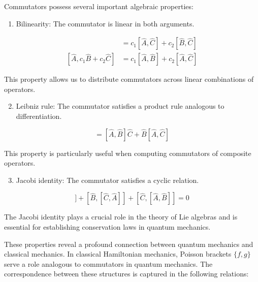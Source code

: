 \documentclass[10pt]{article}
\begin{document}
Commutators possess several important algebraic properties:

\begin{enumerate}
  \item Bilinearity: The commutator is linear in both arguments.
\end{enumerate}

\begin{align*}
[c_{1}\hat{A} + c_{2}\hat{B}, \hat{C}] &= c_{1}[\hat{A}, \hat{C}] + c_{2}[\hat{B}, \hat{C}] \\
[\hat{A}, c_{1}\hat{B} + c_{2}\hat{C}] &= c_{1}[\hat{A}, \hat{B}] + c_{2}[\hat{A}, \hat{C}] \tag{1.53}
\end{align*}

This property allows us to distribute commutators across linear combinations of operators.

\begin{enumerate}
  \setcounter{enumi}{1}
  \item Leibniz rule: The commutator satisfies a product rule analogous to differentiation.
\end{enumerate}

\begin{equation*}
[\hat{A}, \hat{B}\hat{C}] = [\hat{A}, \hat{B}]\hat{C} + \hat{B}[\hat{A}, \hat{C}] \tag{1.54}
\end{equation*}

This property is particularly useful when computing commutators of composite operators.

\begin{enumerate}
  \setcounter{enumi}{2}
  \item Jacobi identity: The commutator satisfies a cyclic relation.
\end{enumerate}

\begin{equation*}
[\hat{A},[\hat{B}, \hat{C}]] + [\hat{B},[\hat{C}, \hat{A}]] + [\hat{C},[\hat{A}, \hat{B}]] = 0 \tag{1.55}
\end{equation*}

The Jacobi identity plays a crucial role in the theory of Lie algebras and is essential for establishing conservation laws in quantum mechanics.

These properties reveal a profound connection between quantum mechanics and classical mechanics. In classical Hamiltonian mechanics, Poisson brackets $\{f,g\}$ serve a role analogous to commutators in quantum mechanics. The correspondence between these structures is captured in the following relations:
\end{document}
